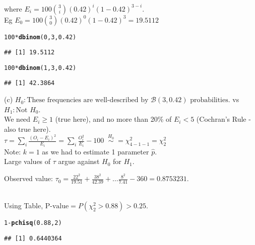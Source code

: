 \documentclass[bigtut]{tutorial}\usepackage[]{graphicx}\usepackage[]{color}
\makeatletter
\newcommand{\hlnum}[1]{\textcolor[rgb]{0.686,0.059,0.569}{#1}}%
\newcommand{\hlopt}[1]{\textcolor[rgb]{0,0,0}{#1}}%
\newcommand{\hlstd}[1]{\textcolor[rgb]{0.345,0.345,0.345}{#1}}%
\newcommand{\hlkwd}[1]{\textcolor[rgb]{0.737,0.353,0.396}{\textbf{#1}}}%
\newenvironment{kframe}{%
 \def\at@end@of@kframe{}%
 \ifinner\ifhmode%
  \def\at@end@of@kframe{\end{minipage}}%
  \begin{minipage}{\columnwidth}%
 \fi\fi%
 \def\FrameCommand##1{\hskip\@totalleftmargin \hskip-\fboxsep
 \colorbox{shadecolor}{##1}\hskip-\fboxsep
     \hskip-\linewidth \hskip-\@totalleftmargin \hskip\columnwidth}%
 \MakeFramed {\advance\hsize-\width
   \@totalleftmargin\z@ \linewidth\hsize
   \@setminipage}}%
 {\par\unskip\endMakeFramed%
 \at@end@of@kframe}
\newenvironment{knitrout}{}{} %
\makeatother
\begin{document}
\begin{tutorial}
\begin{questions}
\begin{solution}
where $E_i = 100 {3 \choose i} (0.42)^i (1-0.42 )^{3-i}$. \\
Eg $E_0 = 100 {3 \choose 0} (0.42)^0 (1-0.42 )^{3} = 19.5112$ \\

\begin{knitrout}
\color{fgcolor}\begin{kframe}
\begin{alltt}
\hlnum{100}\hlopt{*}\hlkwd{dbinom}\hlstd{(}\hlnum{0}\hlstd{,}\hlnum{3}\hlstd{,}\hlnum{0.42}\hlstd{)}
\end{alltt}
\begin{verbatim}
## [1] 19.5112
\end{verbatim}
\begin{alltt}
\hlnum{100}\hlopt{*}\hlkwd{dbinom}\hlstd{(}\hlnum{1}\hlstd{,}\hlnum{3}\hlstd{,}\hlnum{0.42}\hlstd{)}
\end{alltt}
\begin{verbatim}
## [1] 42.3864
\end{verbatim}
\end{kframe}
\end{knitrout}

\vspace{.5cm}
(c)
$H_0: \text{These frequencies are
well-described by } \mathcal B(3,0.42) \text{ probabilities.}$ \;\; vs $H_1: \text{Not } H_{0}$. \\

 We need $E_{i} \geq 1$ (true here), and no more than 20\% of $E_{i} < 5$ (Cochran's Rule - also true here).\\

 $\tau = \sum_{i}  \frac{  (O_i - E_i)^2  } {  E_i }  =   \sum_{i}  \frac{  O_i^2  } {  E_i }  -100   \; \; 
\overset{H_0}{\sim} \; = \chi^2_{4-1-1} = \chi^2_{2}$ \\

Note: $k=1$ as we had to estimate 1 parameter $\hat{p}$. \\

Large values of $\tau$ argue against $H_{0}$ for $H_{1}$.

Observed value: $\tau_{0} = 
\frac{22^2}{19.51} + \frac{38^2}{42.39} + \ldots \frac{8^2}{7.41} - 360 = 0.8753231$.

  \\

Using Table,  $\text{P-value} =  P(\chi^2_{2} > 0.88) > 0.25$. 

\begin{knitrout}
\color{fgcolor}\begin{kframe}
\begin{alltt}
\hlnum{1}\hlopt{-}\hlkwd{pchisq}\hlstd{(}\hlnum{0.88}\hlstd{,}\hlnum{2}\hlstd{)}
\end{alltt}
\begin{verbatim}
## [1] 0.6440364
\end{verbatim}
\end{kframe}
\end{knitrout}


\end{solution}
\end{questions}
\end{tutorial}
\end{document}
